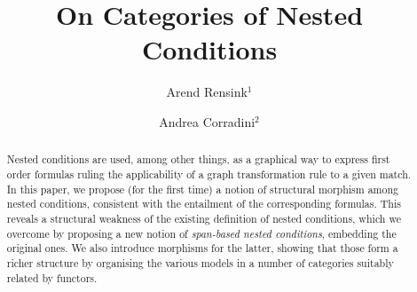 \title{On Categories of Nested Conditions}

\author{Arend Rensink$^1$ \and Andrea Corradini$^2$}

\maketitle

\begin{abstract}
Nested conditions are used, among other things, as a graphical way to express first order formulas ruling the applicability of a graph transformation rule to a given match. In this paper, we propose (for the first time) a notion of structural morphism among nested conditions, consistent with the entailment of the corresponding formulas. This reveals a structural weakness of the existing definition of nested conditions, which we overcome by proposing a new notion of \emph{span-based nested conditions}, embedding the original ones. We also introduce morphisms for the latter, showing that those form a richer structure by organising the various models in a number of categories suitably related by functors.
\end{abstract}
